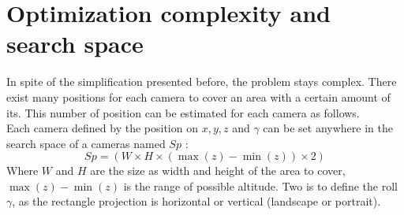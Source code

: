 %    


 
 \section{Optimization complexity and search space} \label{sec:OptimizationComplexity}
 
In spite of the simplification presented before, the problem stays complex. There exist many positions for each camera to cover an area with a certain amount of its. This number of position can be estimated for each camera as follows.\\   
Each camera defined by the position on $x, y, z $ and $ \gamma$ can be set anywhere in the search space of a cameras named $Sp$ : 
\begin{equation}\label{eq:SearchSpace}
 Sp=(W\times H \times ( \max(z)-\min(z)) \times 2 )  
\end{equation}
Where $W$ and $H$ are the size as width and height of the area to cover, $\max(z)-\min(z)$ is the range of possible altitude. Two is to define the roll $\gamma$, as the rectangle projection is horizontal or vertical (landscape or portrait).%

